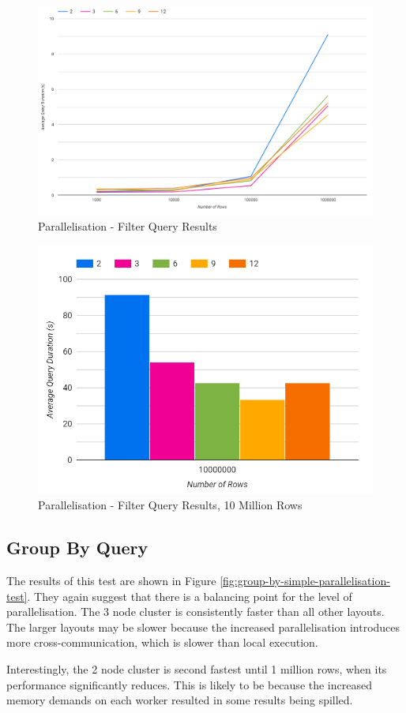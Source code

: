 \begin{figure}[ht]
	\centering
	\includegraphics[width=0.8\linewidth]{chapters/diagrams/testing/filter-simple-parallelisation-test}
	\caption{Parallelisation - Filter Query Results}
	\label{fig:filter-simple-parallelisation-test}
\end{figure}

\begin{figure}[ht]
	\centering
	\includegraphics[width=0.4\linewidth]{chapters/diagrams/testing/filter-simple-parallelisation-10m}
	\caption{Parallelisation - Filter Query Results, 10 Million Rows}
	\label{fig:filter-simple-parallelisation-10m}
\end{figure}

\subsection{Group By Query}
The results of this test are shown in Figure \ref{fig:group-by-simple-parallelisation-test}. They again suggest that there is a balancing point for the level of parallelisation. The 3 node cluster is consistently faster than all other layouts. The larger layouts may be slower because the increased parallelisation introduces more cross-communication, which is slower than local execution.

Interestingly, the 2 node cluster is second fastest until 1 million rows, when its performance significantly reduces. This is likely to be because the increased memory demands on each worker resulted in some results being spilled.


